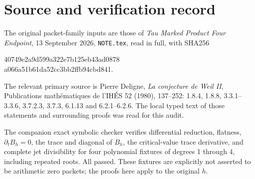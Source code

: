 \documentclass[11pt]{article}
\begin{document}
\section*{Source and verification record}
The original packet-family inputs are those of
\emph{Tau Marked Product Four Endpoint}, 13 September 2026,
\texttt{NOTE.tex}, read in full, with SHA256
\begin{center}\ttfamily\small
40749e2a9d599a322e7b125eb43ad0878\\
a066a51b61da52cc3bb2ffb94cbd841.
\end{center}
The relevant primary source is Pierre Deligne,
\emph{La conjecture de Weil II}, Publications math\'ematiques de
l'IH\'ES 52 (1980), 137--252: 1.8.4, 1.8.8, 3.3.1--3.3.6,
3.7.2.3, 3.7.3, 6.1.13 and 6.2.1--6.2.6.  The local typed text of
those statements and surrounding proofs was read for this audit.

The companion exact symbolic checker verifies differential reduction,
flatness, $\partial_tB_h=0$, the trace and diagonal of $B_h$, the
critical-value trace derivative, and complete jet divisibility for four
polynomial fixtures of degrees 1 through 4, including repeated roots.
All passed.  These fixtures are explicitly not asserted to be
arithmetic zero packets; the proofs here apply to the original $h$.
\end{document}
